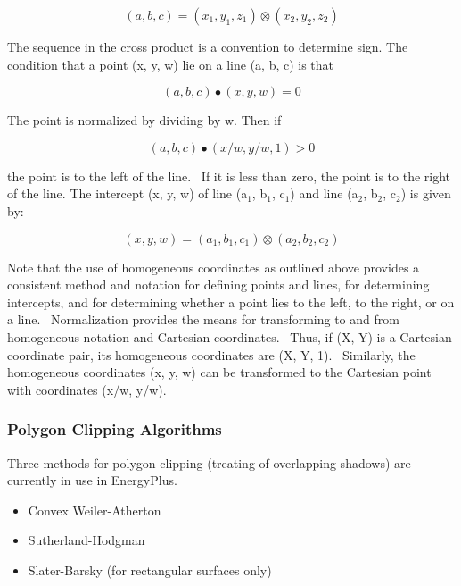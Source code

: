 \begin{equation}
(a,b,c) = ({x_1},{y_1},{z_1}) \otimes ({x_2},{y_2},{z_2})
\end{equation}

The sequence in the cross product is a convention to determine sign. The condition that a point (x, y, w) lie on a line (a, b, c) is that

\begin{equation}
(a,b,c) \bullet (x,y,w) = 0
\end{equation}

The point is normalized by dividing by w. Then if

\begin{equation}
(a,b,c) \bullet (x/w,y/w,1) > 0
\end{equation}

the point is to the left of the line.~ If it is less than zero, the point is to the right of the line. The intercept (x, y, w) of line (a\(_{1}\), b\(_{1}\), c\(_{1}\)) and line (a\(_{2}\), b\(_{2}\), c\(_{2}\)) is given by:

\begin{equation}
(x,y,w) = ({a_1},{b_1},{c_1}) \otimes ({a_2},{b_2},{c_2})
\end{equation}

Note that the use of homogeneous coordinates as outlined above provides a consistent method and notation for defining points and lines, for determining intercepts, and for determining whether a point lies to the left, to the right, or on a line.~ Normalization provides the means for transforming to and from homogeneous notation and Cartesian coordinates.~ Thus, if (X, Y) is a Cartesian coordinate pair, its homogeneous coordinates are (X, Y, 1).~ Similarly, the homogeneous coordinates (x, y, w) can be transformed to the Cartesian point with coordinates (x/w, y/w).

\subsubsection{Polygon Clipping Algorithms}\label{polygon-clipping-algorithms}

Three methods for polygon clipping (treating of overlapping shadows) are currently in use in EnergyPlus.

\begin{itemize}
\item
  Convex Weiler-Atherton
\item
  Sutherland-Hodgman
\item
  Slater-Barsky (for rectangular surfaces only)
\end{itemize}

